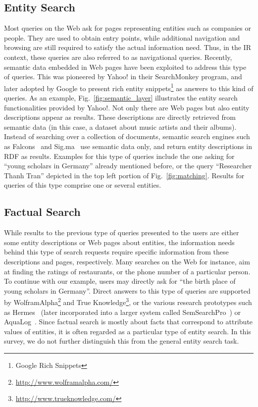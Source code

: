 \subsection{Entity Search} Most queries on the Web ask for pages representing entities such as companies or people. They are used to obtain entry points, while additional navigation and browsing are still required to satisfy the actual information need. Thus, in the IR context, these queries are also referred to as navigational queries. Recently, semantic data embedded in Web pages have been exploited to address this type of queries. This was pioneered by Yahoo! in their SearchMonkey program, and later adopted by Google to present rich entity snippets\footnote{Google Rich Snippets} as answers to this kind of queries. As an example, Fig.~\ref{fig:semantic_layer} illustrates the entity search functionalities provided by Yahoo!. Not only there are Web pages but also entity descriptions appear as results. These descriptions are directly retrieved from semantic data (in this case, a dataset about music artists and their albums). Instead of searching over a collection of documents, semantic search engines such as Falcons~\cite{DBLP:journals/ijswis/ChengQ09} and Sig.ma~\cite{DBLP:journals/ws/TummarelloCCDDD10} use semantic data only, and return entity descriptions in RDF as results. Examples for this type of queries include the one asking for ``young scholars in Germany'' already mentioned before, or the query ``Researcher Thanh Tran'' depicted in the top left portion of Fig.~\ref{fig:matching}. Results for queries of this type comprise one or several entities. 
	 
\subsection{Factual Search} While results to the previous type of queries presented to the users are either some entity descriptions or Web pages about entities, the information needs behind this type of search requests require specific information from these descriptions and pages, respectively. Many searches on the Web for instance, aim at finding the ratings of restaurants, or the phone number of a particular person. To continue with our example, users may directly ask for ``the birth place of young scholars in Germany''. Direct answers to this type of queries are supported by WolframAlpha\footnote{\url{http://www.wolframalpha.com/}} and True Knowledge\footnote{\url{http://www.trueknowledge.com/}}, or the various research prototypes such as Hermes~\cite{DBLP:journals/ws/TranWH09} (later incorporated into a larger system called SemSearchPro~\cite{DBLP:journals/ws/TranHL11}) or AquaLog~\cite{DBLP:journals/ws/LopezUMP07}. Since factual search is mostly about facts that correspond to attribute values of entities, it is often regarded as a particular type of entity search. In this survey, we do not further distinguish this from the general entity search task. 
 
